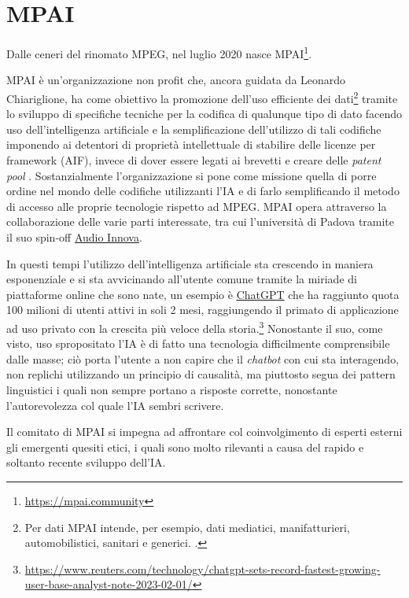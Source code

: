 
\chapter{MPAI} \label{chp:mpai}
Dalle ceneri del rinomato \ac{MPEG}, nel luglio 2020 nasce \ac{MPAI}\footnote{\url{https://mpai.community}}.

\ac{MPAI} è un'organizzazione non profit che, ancora guidata da Leonardo Chiariglione, ha come obiettivo la promozione dell'uso efficiente dei dati\footnote{Per dati \ac{MPAI} intende, per esempio, dati mediatici, manifatturieri, automobilistici, sanitari e generici. \cite{mpaiMPAICommunity}.} tramite lo sviluppo di specifiche tecniche per la codifica di qualunque tipo di dato facendo uso dell'intelligenza artificiale e la semplificazione dell'utilizzo di tali codifiche imponendo ai detentori di proprietà intellettuale di stabilire delle licenze per framework (\acs{AIF}), invece di dover essere legati ai brevetti e creare delle \textit{patent pool} \cite{mpaiMPAICommunity}. Sostanzialmente l'organizzazione si pone come missione quella di porre ordine nel mondo delle codifiche utilizzanti l'IA e di farlo semplificando il metodo di accesso alle proprie tecnologie rispetto ad \ac{MPEG}.
\ac{MPAI} opera attraverso la collaborazione delle varie parti interessate, tra cui l'università di Padova tramite il suo spin-off \href{www.audioinnova.com}{Audio Innova}.

In questi tempi l'utilizzo dell'intelligenza artificiale sta crescendo in maniera esponenziale e si sta avvicinando all'utente comune tramite la miriade di piattaforme online che sono nate, un esempio è \href{https://chat.openai.com}{ChatGPT} che ha raggiunto quota 100 milioni di utenti attivi in soli 2 mesi, raggiungendo il primato di applicazione ad uso privato con la crescita più veloce della storia.\footnote{\url{https://www.reuters.com/technology/chatgpt-sets-record-fastest-growing-user-base-analyst-note-2023-02-01/}} Nonostante il suo, come visto, uso spropositato l'IA è di fatto una tecnologia difficilmente comprensibile dalle masse; ciò porta l'utente a non capire che il \textit{chatbot} con cui sta interagendo, non replichi utilizzando un principio di causalità, ma piuttosto segua dei pattern linguistici i quali non sempre portano a risposte corrette, nonostante l'autorevolezza col quale l'IA sembri scrivere.

Il comitato di \ac{MPAI} si impegna ad affrontare col coinvolgimento di esperti esterni gli emergenti quesiti etici, i quali sono molto rilevanti a causa del rapido e soltanto recente sviluppo dell'IA.

